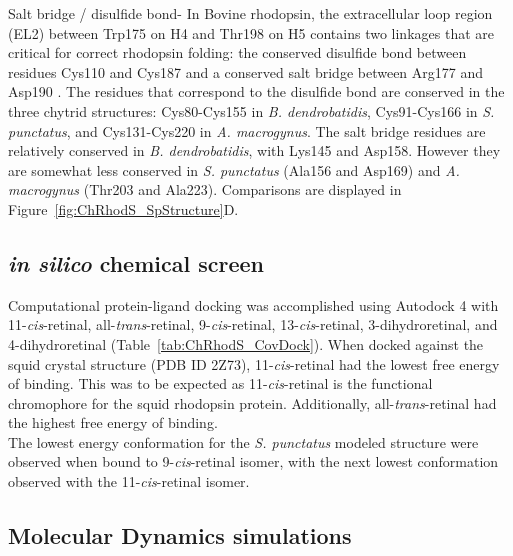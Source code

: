 \indent Salt bridge / disulfide bond- In Bovine rhodopsin, the extracellular loop region (EL2) between Trp175 on H4 and Thr198 on H5 contains two linkages that are critical for correct rhodopsin folding: the conserved disulfide bond between residues Cys110 and Cys187 and a conserved salt bridge between Arg177 and Asp190 \cite{Smith2010}. The residues that correspond to the disulfide bond are conserved in the three chytrid structures: Cys80-Cys155 in \textit{B. dendrobatidis}, Cys91-Cys166 in \textit{S. punctatus}, and Cys131-Cys220 in \textit{A. macrogynus}. The salt bridge residues are relatively conserved in \textit{B. dendrobatidis}, with Lys145 and Asp158. However they are somewhat less conserved in \textit{S. punctatus} (Ala156 and Asp169) and \textit{A. macrogynus} (Thr203 and Ala223). Comparisons are displayed in Figure~\ref{fig:ChRhodS_SpStructure}D.
\subsection*{\textit{in silico} chemical screen}
Computational protein-ligand docking was accomplished using Autodock 4 with 11-\textit{cis}-retinal, all-\textit{trans}-retinal, 9-\textit{cis}-retinal, 13-\textit{cis}-retinal, 3-dihydroretinal, and 4-dihydroretinal (Table~\ref{tab:ChRhodS_CovDock}). When docked against the squid crystal structure (PDB ID 2Z73), 11-\textit{cis}-retinal had the lowest free energy of binding. This was to be expected as 11-\textit{cis}-retinal is the functional chromophore for the squid rhodopsin protein. Additionally, all-\textit{trans}-retinal had the highest free energy of binding.\\
\indent The lowest energy conformation for the \textit{S. punctatus} modeled structure were observed when bound to 9-\textit{cis}-retinal isomer, with the next lowest conformation observed with the 11-\textit{cis}-retinal isomer.\\
\subsection*{Molecular Dynamics simulations}

